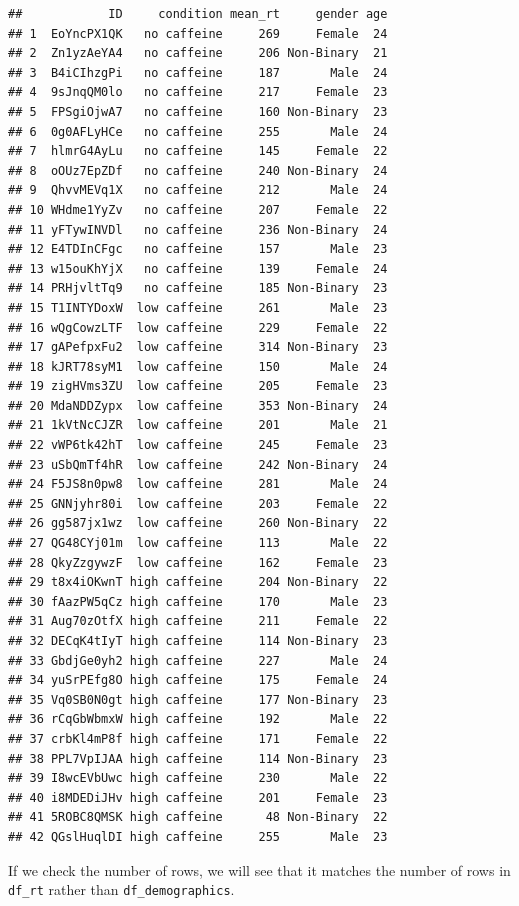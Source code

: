 \documentclass[
]{book}
\begin{document}
\begin{verbatim}
##            ID     condition mean_rt     gender age
## 1  EoYncPX1QK   no caffeine     269     Female  24
## 2  Zn1yzAeYA4   no caffeine     206 Non-Binary  21
## 3  B4iCIhzgPi   no caffeine     187       Male  24
## 4  9sJnqQM0lo   no caffeine     217     Female  23
## 5  FPSgiOjwA7   no caffeine     160 Non-Binary  23
## 6  0g0AFLyHCe   no caffeine     255       Male  24
## 7  hlmrG4AyLu   no caffeine     145     Female  22
## 8  oOUz7EpZDf   no caffeine     240 Non-Binary  24
## 9  QhvvMEVq1X   no caffeine     212       Male  24
## 10 WHdme1YyZv   no caffeine     207     Female  22
## 11 yFTywINVDl   no caffeine     236 Non-Binary  24
## 12 E4TDInCFgc   no caffeine     157       Male  23
## 13 w15ouKhYjX   no caffeine     139     Female  24
## 14 PRHjvltTq9   no caffeine     185 Non-Binary  23
## 15 T1INTYDoxW  low caffeine     261       Male  23
## 16 wQgCowzLTF  low caffeine     229     Female  22
## 17 gAPefpxFu2  low caffeine     314 Non-Binary  23
## 18 kJRT78syM1  low caffeine     150       Male  24
## 19 zigHVms3ZU  low caffeine     205     Female  23
## 20 MdaNDDZypx  low caffeine     353 Non-Binary  24
## 21 1kVtNcCJZR  low caffeine     201       Male  21
## 22 vWP6tk42hT  low caffeine     245     Female  23
## 23 uSbQmTf4hR  low caffeine     242 Non-Binary  24
## 24 F5JS8n0pw8  low caffeine     281       Male  24
## 25 GNNjyhr80i  low caffeine     203     Female  22
## 26 gg587jx1wz  low caffeine     260 Non-Binary  22
## 27 QG48CYj01m  low caffeine     113       Male  22
## 28 QkyZzgywzF  low caffeine     162     Female  23
## 29 t8x4iOKwnT high caffeine     204 Non-Binary  22
## 30 fAazPW5qCz high caffeine     170       Male  23
## 31 Aug70zOtfX high caffeine     211     Female  22
## 32 DECqK4tIyT high caffeine     114 Non-Binary  23
## 33 GbdjGe0yh2 high caffeine     227       Male  24
## 34 yuSrPEfg8O high caffeine     175     Female  24
## 35 Vq0SB0N0gt high caffeine     177 Non-Binary  23
## 36 rCqGbWbmxW high caffeine     192       Male  22
## 37 crbKl4mP8f high caffeine     171     Female  22
## 38 PPL7VpIJAA high caffeine     114 Non-Binary  23
## 39 I8wcEVbUwc high caffeine     230       Male  22
## 40 i8MDEDiJHv high caffeine     201     Female  23
## 41 5ROBC8QMSK high caffeine      48 Non-Binary  22
## 42 QGslHuqlDI high caffeine     255       Male  23
\end{verbatim}

If we check the number of rows, we will see that it matches the number of rows in \texttt{df\_rt} rather than \texttt{df\_demographics}.
\end{document}
